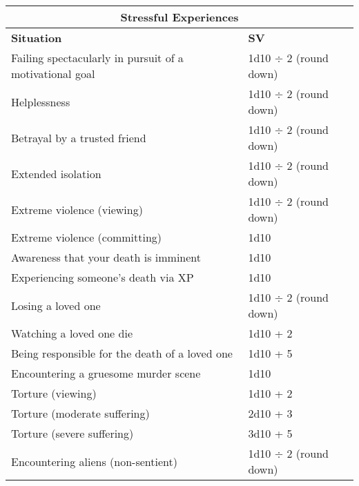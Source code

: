 \begin{table} \begin{tabularx}{\textwidth}{|X|l|} \hline

\multicolumn{2}{|c|}{\textbf{Stressful Experiences} } \\ \hline

\textbf{Situation}	&\textbf{SV} \\ \hline

Failing spectacularly in pursuit of a motivational goal	&1d10 $\div$ 2 (round down)	\\ \hline

Helplessness	&1d10 $\div$ 2 (round down)	\\ \hline

Betrayal by a trusted friend	&1d10 $\div$ 2 (round down)	\\ \hline

Extended isolation	&1d10 $\div$ 2 (round down)	\\ \hline

Extreme violence (viewing)	&1d10 $\div$ 2 (round down)	\\ \hline

Extreme violence (committing)	&1d10	\\ \hline

Awareness that your death is imminent	&1d10	\\ \hline

Experiencing someone’s death via XP	&1d10	\\ \hline

Losing a loved one	&1d10 $\div$ 2 (round down)	\\ \hline

Watching a loved one die	&1d10 + 2	\\ \hline

Being responsible for the death of a loved one	&1d10 + 5	\\ \hline

Encountering a gruesome murder scene	&1d10	\\ \hline

Torture (viewing)	&1d10 + 2	\\ \hline

Torture (moderate suffering)	&2d10 + 3	\\ \hline

Torture (severe suffering)	&3d10 + 5	\\ \hline

Encountering aliens (non-sentient)	&1d10 $\div$ 2 (round down)	\\ \hline


\end{tabularx}
\end{table}

